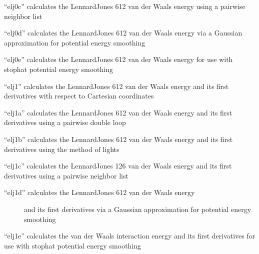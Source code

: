 \documentclass[letterpaper,11pt,english]{sphinxmanual}
\begin{document}

“elj0c” calculates the Lennard\sphinxhyphen{}Jones 6\sphinxhyphen{}12 van der Waals energy
using a pairwise neighbor list


“elj0d” calculates the Lennard\sphinxhyphen{}Jones 6\sphinxhyphen{}12 van der Waals energy
via a Gaussian approximation for potential energy smoothing


“elj0e” calculates the Lennard\sphinxhyphen{}Jones 6\sphinxhyphen{}12 van der Waals energy
for use with stophat potential energy smoothing


“elj1” calculates the Lennard\sphinxhyphen{}Jones 6\sphinxhyphen{}12 van der Waals energy
and its first derivatives with respect to Cartesian coordinates


“elj1a” calculates the Lennard\sphinxhyphen{}Jones 6\sphinxhyphen{}12 van der Waals energy
and its first derivatives using a pairwise double loop


“elj1b” calculates the Lennard\sphinxhyphen{}Jones 6\sphinxhyphen{}12 van der Waals energy
and its first derivatives using the method of lights


“elj1c” calculates the Lennard\sphinxhyphen{}Jones 12\sphinxhyphen{}6 van der Waals energy
and its first derivatives using a pairwise neighbor list

\begin{description}
\item[{“elj1d” calculates the Lennard\sphinxhyphen{}Jones 6\sphinxhyphen{}12 van der Waals energy}] \leavevmode
and its first derivatives via a Gaussian approximation for
potential energy smoothing

\end{description}


“elj1e” calculates the van der Waals interaction energy and its
first derivatives for use with stophat potential energy smoothing

\end{document}
